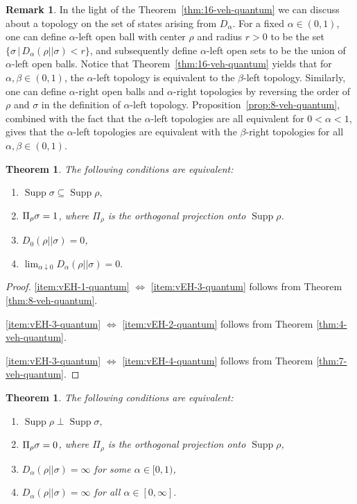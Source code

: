 \documentclass[12pt,a4paper,oneside]{article}
\numberwithin{equation}{section}
\theoremstyle{definition}  %
\newtheorem{rmk}[defn]{Remark}
\theoremstyle{plain}  %
\newtheorem{thm}[defn]{Theorem}
\theoremstyle{remark} %
\let\tr\relax
\DeclareMathOperator{\tr}{Tr}
\DeclareMathOperator{\supp}{Supp}
\begin{document}
\begin{rmk}In the light of the Theorem~\ref{thm:16-veh-quantum} we can discuss about a topology on the set of states arising from $D_{\alpha}$.
For a fixed $\alpha \in (0,1)$, one can define $\alpha$-left open ball with center $\rho$ and radius $r>0$ to be the set
$\{ \sigma\,|\, D_\alpha(\rho||\sigma) <r\}$, and subsequently define $\alpha$-left open sets to be the union of $\alpha$-left open balls.
Notice that Theorem~\ref{thm:16-veh-quantum} yields that for $\alpha, \beta \in (0,1)$, the $\alpha$-left topology is equivalent to the 
$\beta$-left topology. Similarly, one can define $\alpha$-right open balls and $\alpha$-right topologies by reversing the order 
of $\rho$ and $\sigma$ in the definition of $\alpha$-left topology. Proposition~\ref{prop:8-veh-quantum}, combined with the fact that the 
$\alpha$-left topologies are all equivalent for $0<\alpha<1$, gives that the $\alpha$-left topologies are equivalent with the 
$\beta$-right topologies for all $\alpha, \beta \in (0,1)$.
\end{rmk}
\begin{thm}
\label{thm:23-veh-quantum}The following conditions are equivalent:
\begin{enumerate}
    \item \label{item:vEH-1-quantum}$\supp \sigma \subseteq \supp \rho,$
    \item \label{item:vEH-2-quantum} $\tr \Pi_\rho\sigma = 1$, where $\Pi_\rho$ is the orthogonal projection onto $\supp \rho$.
    \item\label{item:vEH-3-quantum} $D_0(\rho||\sigma) = 0$,
    \item\label{item:vEH-4-quantum} $\lim_{\alpha \downarrow 0} D_{\alpha}(\rho||\sigma) = 0.$
\end{enumerate}
\end{thm}
\begin{proof}
\ref{item:vEH-1-quantum} $\Leftrightarrow$ \ref{item:vEH-3-quantum} follows from Theorem \ref{thm:8-veh-quantum}. 

\ref{item:vEH-3-quantum} $\Leftrightarrow$ \ref{item:vEH-2-quantum} follows from Theorem \ref{thm:4-veh-quantum}. 


\ref{item:vEH-3-quantum} $\Leftrightarrow$ \ref{item:vEH-4-quantum} follows from Theorem \ref{thm:7-veh-quantum}.
\end{proof}
\begin{thm}
\label{thm:24-veh-quantum}The following conditions are equivalent:
\begin{enumerate}
    \item \label{item:vEH-5-quantum}$\supp \rho\perp \supp \sigma,$
    \item \label{item:vEH-6-quantum} $\tr \Pi_\rho\sigma = 0$, where $\Pi_\rho$ is the orthogonal projection onto $\supp \rho$,
    \item\label{item:vEH-7-quantum} $D_{\alpha}(\rho||\sigma) = \infty$ for some $\alpha\in [0,1)$,
    \item\label{item:vEH-8-quantum} $D_{\alpha}(\rho||\sigma) = \infty$ for all $\alpha\in [0,\infty].$
\end{enumerate}
\end{thm}
\end{document}
